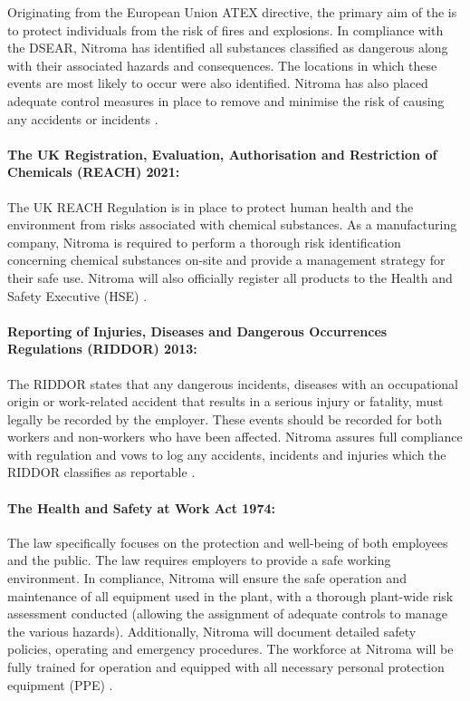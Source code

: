 Originating from the European Union ATEX directive, the primary aim of the is to protect individuals from the risk of fires and explosions. In compliance with the DSEAR, Nitroma has identified all substances classified as dangerous along with their associated hazards and consequences. The locations in which these events are most likely to occur were also identified. Nitroma has also placed adequate control measures in place to remove and minimise the risk of causing any accidents or incidents \cite{health_and_safety_executive_dangerous_nodate}. 

\paragraph{The UK Registration, Evaluation, Authorisation and Restriction of Chemicals (REACH) 2021:}

The UK REACH Regulation is in place to protect human health and the environment from risks associated with chemical substances. As a manufacturing company, Nitroma is required to perform a thorough risk identification concerning chemical substances on-site and provide a management strategy for their safe use. Nitroma will also officially register all products to the Health and Safety Executive (HSE) \cite{health_and_safety_executive_uk_nodate}. 

\paragraph{Reporting of Injuries, Diseases and Dangerous Occurrences Regulations (RIDDOR) 2013:}

The RIDDOR states that any dangerous incidents, diseases with an occupational origin or work-related accident that results in a serious injury or fatality, must legally be recorded by the employer. These events should be recorded for both workers and non-workers who have been affected. Nitroma assures full compliance with regulation and vows to log any accidents, incidents and injuries which the RIDDOR classifies as reportable \cite{health_and_safety_executive_reporting_2013}.

\paragraph{The Health and Safety at Work Act 1974:}

The law specifically focuses on the protection and well-being of both employees and the public. The law requires employers to provide a safe working environment. In compliance, Nitroma will ensure the safe operation and maintenance of all equipment used in the plant, with a thorough plant-wide risk assessment conducted (allowing the assignment of adequate controls to manage the various hazards). Additionally, Nitroma will document detailed safety policies, operating and emergency procedures. The workforce at Nitroma will be fully trained for operation and equipped with all necessary personal protection equipment (PPE) \cite{british_safety_council_health_nodate}.

